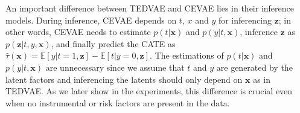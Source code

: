 \documentclass[letterpaper]{article} %
\begin{document}
An important difference between TEDVAE and CEVAE lies in their inference models.
During inference, CEVAE depends on $t$, $x$ and $y$ for inferencing $\mathbf{z}$; in other words, CEVAE needs to estimate $p(t|\mathbf{x})$ and $p(y|t,\mathbf{x})$, inference $\mathbf{z}$ as $p(\mathbf{z}|t,y,\mathbf{x})$, and finally predict the CATE as $\hat{\tau} (\mathbf{x}) = \mathbb{E}[y|t=1,\mathbf{z}] - \mathbb{E}[t|y=0, \mathbf{z}]$.
The estimations of $p(t|\mathbf{x})$ and $p(y|t,\mathbf{x})$ are unnecessary since we assume that $t$ and $y$ are generated by the latent factors and inferencing the latents should only depend on $\mathbf{x}$ as in TEDVAE.
As we later show in the experiments, this difference is crucial even when no instrumental or risk factors are present in the data.


\end{document}
